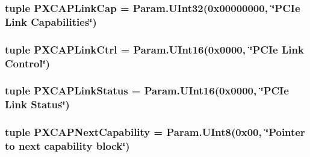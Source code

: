 \label{classPci_1_1PciDevice_af7deb8e97cf1e53524d5ef5239e8d099}
\hypertarget{classPci_1_1PciDevice_a6bbe8e0a13547fa64b787a6c5661703b}{
\subsubsection[{PXCAPLinkCap}]{\setlength{\rightskip}{0pt plus 5cm}tuple {\bf PXCAPLinkCap} = Param.UInt32(0x00000000, \char`\"{}PCIe Link Capabilities\char`\"{})}}
\label{classPci_1_1PciDevice_a6bbe8e0a13547fa64b787a6c5661703b}
\hypertarget{classPci_1_1PciDevice_a98c7ece798cf7c093c09b8437a5d9131}{
\subsubsection[{PXCAPLinkCtrl}]{\setlength{\rightskip}{0pt plus 5cm}tuple {\bf PXCAPLinkCtrl} = Param.UInt16(0x0000, \char`\"{}PCIe Link Control\char`\"{})}}
\label{classPci_1_1PciDevice_a98c7ece798cf7c093c09b8437a5d9131}
\hypertarget{classPci_1_1PciDevice_aa9f82b98ef62d06b866799ae754d891f}{
\subsubsection[{PXCAPLinkStatus}]{\setlength{\rightskip}{0pt plus 5cm}tuple {\bf PXCAPLinkStatus} = Param.UInt16(0x0000, \char`\"{}PCIe Link Status\char`\"{})}}
\label{classPci_1_1PciDevice_aa9f82b98ef62d06b866799ae754d891f}
\hypertarget{classPci_1_1PciDevice_a88eb1645e6dce97606bd6f1bf6decfed}{
\subsubsection[{PXCAPNextCapability}]{\setlength{\rightskip}{0pt plus 5cm}tuple {\bf PXCAPNextCapability} = Param.UInt8(0x00, \char`\"{}Pointer to next capability block\char`\"{})}}
